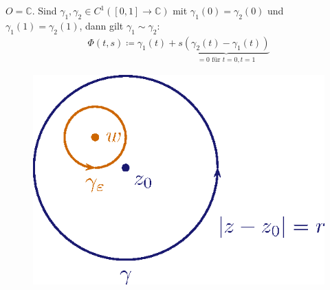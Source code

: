 \documentclass[a4paper,10pt]{scrbook}
\begin{document}
\begin{example}
  \begin{enum-arab}
    \item
    \begin{enum-alph}
      \item $O = \mathbb{C}$. Sind $\gamma_1,\gamma_2 \in C^1([0,1] \to \mathbb{C})$ mit $\gamma_1(0) = \gamma_2(0)$ und $\gamma_1(1) = \gamma_2(1)$, dann gilt $\gamma_1 \sim \gamma_2$:
      \begin{align*}
        \Phi(t,s) \coloneq \gamma_1(t) + s \underbrace{(\gamma_2(t) - \gamma_1(t))}_{=0 \text{ für } t=0, t=1}
      \end{align*}
      \begin{figure}[H]
        \centering
        \includegraphics[scale=0.2]{images/ana3-tmp-8}
      \end{figure}


\end{enum-alph}
\end{enum-arab}
\end{example}
\end{document}
